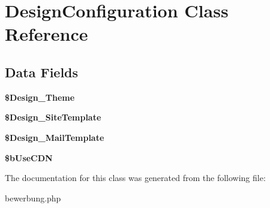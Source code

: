 \hypertarget{class_design_configuration}{\section{Design\-Configuration Class Reference}
\label{class_design_configuration}
}
\subsection*{Data Fields}
\begin{DoxyCompactItemize}
\item 
\hypertarget{class_design_configuration_aa6a673bfeeed33a06179f730cfb16bce}{{\bfseries \$\-Design\-\_\-\-Theme}}\label{class_design_configuration_aa6a673bfeeed33a06179f730cfb16bce}

\item 
\hypertarget{class_design_configuration_a1eb0d69dca5f3175b6be2cab11471dcb}{{\bfseries \$\-Design\-\_\-\-Site\-Template}}\label{class_design_configuration_a1eb0d69dca5f3175b6be2cab11471dcb}

\item 
\hypertarget{class_design_configuration_a85e21a7ddd6ea90db0ec6d8a848de736}{{\bfseries \$\-Design\-\_\-\-Mail\-Template}}\label{class_design_configuration_a85e21a7ddd6ea90db0ec6d8a848de736}

\item 
\hypertarget{class_design_configuration_af003243c44643485b968e87d3f8a7573}{{\bfseries \$b\-Use\-C\-D\-N}}\label{class_design_configuration_af003243c44643485b968e87d3f8a7573}

\end{DoxyCompactItemize}


The documentation for this class was generated from the following file\-:\begin{DoxyCompactItemize}
\item 
bewerbung.\-php\end{DoxyCompactItemize}
